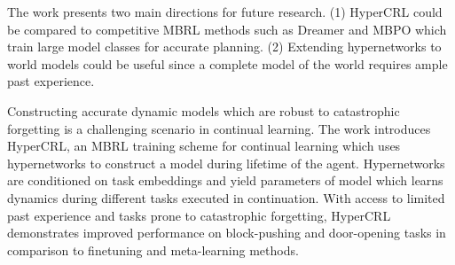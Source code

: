 \documentclass[11pt,letterpaper]{article}
\begin{document}
The work presents two main directions for future research. (1) HyperCRL could be compared to competitive MBRL methods such as Dreamer and MBPO which train large model classes for accurate planning. (2) Extending hypernetworks to world models could be useful since a complete model of the world requires ample past experience. 

Constructing accurate dynamic models which are robust to catastrophic forgetting is a challenging scenario in continual learning. The work introduces HyperCRL, an MBRL training scheme for continual learning which uses hypernetworks to construct a model during lifetime of the agent. Hypernetworks are conditioned on task embeddings and yield parameters of model which learns dynamics during different tasks executed in continuation. With access to limited past experience and tasks prone to catastrophic forgetting, HyperCRL demonstrates improved performance on block-pushing and door-opening tasks in comparison to finetuning and meta-learning methods. 
\end{document}

